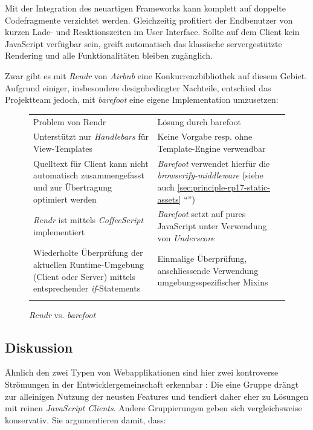 Mit der Integration des neuartigen Frameworks kann komplett auf doppelte Codefragmente verzichtet werden. Gleichzeitig profitiert der Endbenutzer von kurzen Lade- und Reaktionszeiten im User Interface. Sollte auf dem Client kein JavaScript verfügbar sein, greift automatisch das klassische servergestützte Rendering und alle Funktionalitäten bleiben zugänglich.

Zwar gibt es mit \emph{Rendr} von \emph{Airbnb} \cite{Rendr} eine Konkurrenzbibliothek auf diesem Gebiet. Aufgrund einiger, insbesondere designbedingter Nachteile, entschied das Projektteam jedoch, mit \emph{barefoot} eine eigene Implementation umzusetzen:

\begin{figure}[H]
	\begin{table}[H]
		\tablestyle
		\tablealtcolored
		\begin{tabularx}{\textwidth}{X X}
			\tableheadcolor
				\tablehead Problem von Rendr &
				\tablehead Lösung durch barefoot
				\tabularnewline
			\tablebody
				Unterstützt nur \emph{Handlebars} \cite{Handlebars} für View-Templates &
				Keine Vorgabe resp. ohne Template-Engine verwendbar
				\tabularnewline

				Quelltext für Client kann nicht automatisch zusammengefasst und zur Übertragung optimiert werden &
				\emph{Barefoot} verwendet hierfür die \emph{browserify-middleware} (siehe auch \ref{sec:principle-rp17-static-assets} ``\nameref{sec:principle-rp17-static-assets}'')
				\tabularnewline

				\emph{Rendr} ist mittels \emph{CoffeeScript} \cite{CoffeeScript} implementiert &
				\emph{Barefoot} setzt auf pures JavaScript unter Verwendung von \emph{Underscore} \cite{Underscore}
				\tabularnewline

				Wiederholte Überprüfung der aktuellen Runtime-Umgebung (Client oder Server) mittels entsprechender \emph{if}-Statements &
				Einmalige Überprüfung, anschliessende Verwendung umgebungsspezifischer \gls{Mixin}s
				\tabularnewline
			\tableend
		\end{tabularx}
	\end{table}
	\caption{\emph{Rendr} vs. \emph{barefoot}}
	\label{tab:rendr-vs-barefoot}
\end{figure}


\subsection*{Diskussion}

Ähnlich den zwei Typen von Webapplikationen sind hier zwei kontroverse Strömungen in der Entwicklergemeinschaft erkennbar \cite{StackOverflowUnobtrusiveJavascriptOutdated}: Die eine Gruppe drängt zur alleinigen Nutzung der neusten Features und tendiert daher eher zu Lösungen mit reinen \emph{JavaScript Clients}. Andere Gruppierungen geben sich vergleichsweise konservativ. Sie argumentieren damit, dass:

